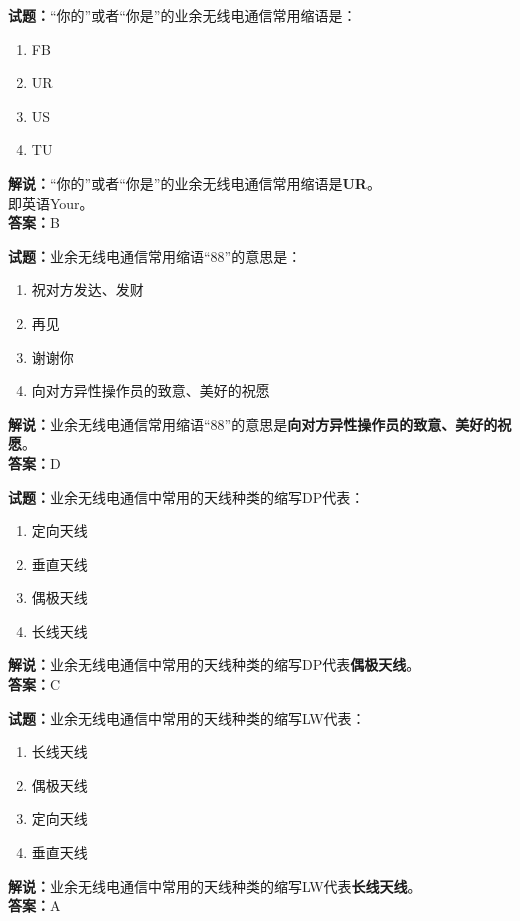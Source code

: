 \documentclass{ctexbook}
\begin{document}
\vspace{1em}

\textbf{试题：}“你的”或者“你是”的业余无线电通信常用缩语是：
\begin{enumerate}[leftmargin=3em]
  \item FB
  \item UR
  \item US
  \item TU
\end{enumerate}
\noindent\textbf{解说：}“你的”或者“你是”的业余无线电通信常用缩语是\textbf{UR}。\\即英语Your。\\\noindent\textbf{答案：}B

\vspace{1em}

\textbf{试题：}业余无线电通信常用缩语“88”的意思是：
\begin{enumerate}[leftmargin=3em]
  \item 祝对方发达、发财
  \item 再见
  \item 谢谢你
  \item 向对方异性操作员的致意、美好的祝愿
\end{enumerate}
\noindent\textbf{解说：}业余无线电通信常用缩语“88”的意思是\textbf{向对方异性操作员的致意、美好的祝愿}。\\\noindent\textbf{答案：}D

\vspace{1em}

\textbf{试题：}业余无线电通信中常用的天线种类的缩写DP代表：
\begin{enumerate}[leftmargin=3em]
  \item 定向天线
  \item 垂直天线
  \item 偶极天线
  \item 长线天线
\end{enumerate}
\noindent\textbf{解说：}业余无线电通信中常用的天线种类的缩写DP代表\textbf{偶极天线}。\\\noindent\textbf{答案：}C

\vspace{1em}

\textbf{试题：}业余无线电通信中常用的天线种类的缩写LW代表：
\begin{enumerate}[leftmargin=3em]
  \item 长线天线
  \item 偶极天线
  \item 定向天线
  \item 垂直天线
\end{enumerate}
\noindent\textbf{解说：}业余无线电通信中常用的天线种类的缩写LW代表\textbf{长线天线}。\\\noindent\textbf{答案：}A
\end{document}
